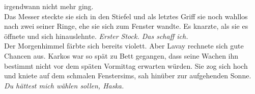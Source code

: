 irgendwann nicht mehr ging.\\
Das Messer steckte sie sich in den Stiefel und als letztes Griff sie noch wahllos nach zwei seiner 
Ringe, ehe sie sich zum Fenster wandte. Es knarzte, als sie es öffnete und sich hinauslehnte. 
\textit{Erster Stock. Das schaff ich.}\\
Der Morgenhimmel färbte sich bereits violett. Aber Lavay rechnete sich gute Chancen aus. Karkos war 
so spät zu Bett gegangen, dass seine Wachen ihn bestimmt nicht vor dem späten Vormittag erwarten 
würden. Sie zog sich hoch und kniete auf dem schmalen Fenstersims, sah hinüber zur aufgehenden 
Sonne.\\
\textit{Du hättest mich wählen sollen, Haska.}\\


